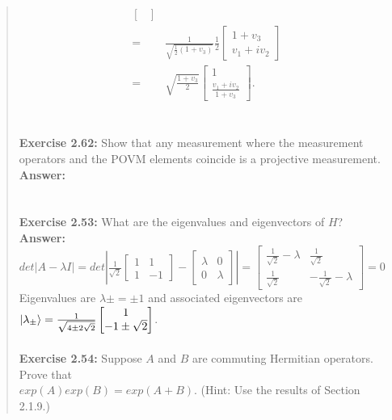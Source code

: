 \documentclass[UTF8]{ctexart}
\begin{document}
\begin{quote}
\begin{equation}
\begin{aligned}
\begin{bmatrix}
		\end{bmatrix}\\
		=&\frac{1}{\sqrt{\frac{1}{2}(1+v_{3})}}\frac{1}{2}
		\begin{bmatrix}
			1+v_{3} \\v_{1}+iv_{2}
		\end{bmatrix} \\
		=&\sqrt{\frac{1+v_{3}}{2}}\begin{bmatrix}
			1 \\ \frac{v_{1}+iv_{2}}{1+v_{3}}
		\end{bmatrix}.
	\end{aligned}
\end{equation}
\\
\\
\textbf{Exercise 2.62:  } Show that any measurement where the measurement operators and the
POVM elements coincide is a projective measurement.
\\
\textbf{Answer:}\\
\\
\\
\textbf{Exercise 2.53:} What are the eigenvalues and eigenvectors of $H$?
\\
\textbf{Answer:}\\
$det|A-\lambda I|=det\left|\frac{1}{\sqrt{2}}\begin{bmatrix}
	1 & 1 \\1 & -1
\end{bmatrix}-\begin{bmatrix}
	\lambda & 0 \\0 & \lambda
\end{bmatrix}\right|=
\begin{bmatrix}
	\frac{1}{\sqrt{2}}-\lambda & \frac{1}{\sqrt{2}} \\
	\frac{1}{\sqrt{2}} & -\frac{1}{\sqrt{2}}-\lambda
\end{bmatrix}=0
$\\
Eigenvalues are $λ\pm = \pm 1$ and associated eigenvectors are 
$\ket{\lambda_{\pm}}=\frac{1}{\sqrt{4\pm 2 \sqrt{2}}}\begin{bmatrix}
	1 \\ -1\pm \sqrt{2}
\end{bmatrix}$.
\\
\\
\textbf{Exercise 2.54: } Suppose $A$ and $B$ are commuting Hermitian operators. Prove that \\
$exp(A) exp(B) = exp(A + B).$ (Hint: Use the results of Section 2.1.9.)
\\

\end{quote}
\end{document}
